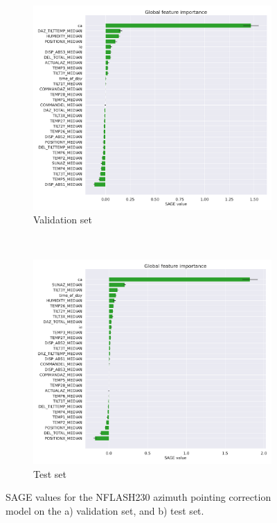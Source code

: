 \begin{figure}[H]
    \centering
    \begin{subfigure}[t]{0.92\textwidth}
        \centering
        \includegraphics[width=\textwidth]{Results/XGB_ds2_tp5_k30_uncorr_az_val_SAGE.pdf}
        \caption{Validation set}
        \label{subfig:sage_lastfold_nflash230_az_val}
    \end{subfigure}
    \\
    \begin{subfigure}[t]{0.92\textwidth}
       \centering
       \includegraphics[width=1\textwidth]{Results/XGB_ds2_tp5_k30_uncorr_az_test_SAGE.pdf}
       \caption{Test set}
       \label{subfig:sage_lastfold_nflash230_az_test}
    \end{subfigure}
    \caption{SAGE values for the NFLASH230 azimuth pointing correction model on the a) validation set, and b) test set.}
    \label{fig:sage_lastfold_nflash230_az}
\end{figure}

